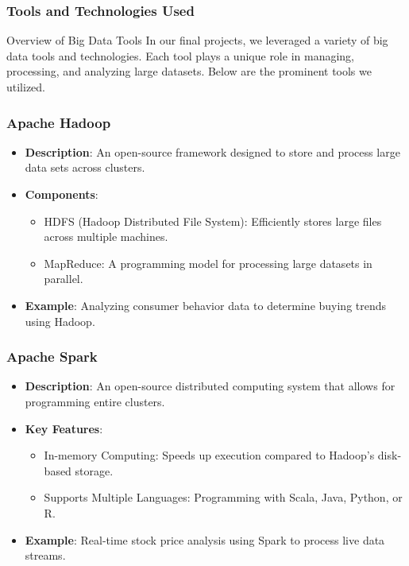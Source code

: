 \documentclass[aspectratio=169]{beamer}
\begin{document}
\begin{frame}[fragile]
    \frametitle{Tools and Technologies Used}
    \begin{block}{Overview of Big Data Tools}
        In our final projects, we leveraged a variety of big data tools and technologies. Each tool plays a unique role in managing, processing, and analyzing large datasets. Below are the prominent tools we utilized.
    \end{block}
\end{frame}

\begin{frame}[fragile]
    \frametitle{Apache Hadoop}
    \begin{itemize}
        \item \textbf{Description}: An open-source framework designed to store and process large data sets across clusters.
        \item \textbf{Components}:
        \begin{itemize}
            \item HDFS (Hadoop Distributed File System): Efficiently stores large files across multiple machines.
            \item MapReduce: A programming model for processing large datasets in parallel.
        \end{itemize}
        \item \textbf{Example}: Analyzing consumer behavior data to determine buying trends using Hadoop.
    \end{itemize}
\end{frame}

\begin{frame}[fragile]
    \frametitle{Apache Spark}
    \begin{itemize}
        \item \textbf{Description}: An open-source distributed computing system that allows for programming entire clusters.
        \item \textbf{Key Features}:
        \begin{itemize}
            \item In-memory Computing: Speeds up execution compared to Hadoop’s disk-based storage.
            \item Supports Multiple Languages: Programming with Scala, Java, Python, or R.
        \end{itemize}
        \item \textbf{Example}: Real-time stock price analysis using Spark to process live data streams.
    \end{itemize}
\end{frame}
\end{document}
